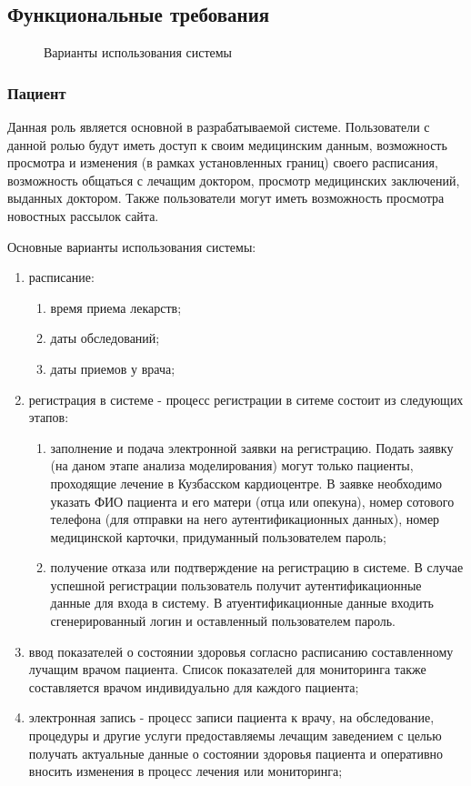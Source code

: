 \subsection{Функциональные требования}
\begin{figure}[h]
\caption{Варианты использования системы}
\label{ris:main_use_case}
\end{figure}

\subsubsection{Пациент}
Данная роль является основной в разрабатываемой системе. Пользователи с данной
ролью будут иметь доступ к своим медицинским данным, возможность просмотра и
изменения (в рамках установленных границ) своего расписания, возможность
общаться с лечащим доктором, просмотр медицинских заключений, выданных доктором.
Также пользователи могут иметь возможность просмотра новостных рассылок сайта.

Основные варианты использования системы:

\begin{enumerate}
  \item расписание:
  \begin{enumerate}
    \item время приема лекарств;
    \item даты обследований;
    \item даты приемов у врача;     
  \end{enumerate}
  \item регистрация в системе - процесс регистрации в ситеме состоит из
  следующих этапов:
  \begin{enumerate}
    \item заполнение и подача электронной заявки на регистрацию. Подать заявку
    (на даном этапе анализа моделирования) могут только пациенты, проходящие
    лечение в Кузбасском кардиоцентре. 
    В заявке необходимо указать ФИО пациента и его матери (отца или опекуна), номер сотового телефона (для отправки на него аутентификационных данных), номер медицинской карточки, придуманный пользователем пароль;
    \item получение отказа или подтверждение на регистрацию в системе. В случае
    успешной регистрации пользователь получит аутентификационные данные для
    входа в систему. В атуентификационные данные входить сгенерированный логин и
    оставленный пользователем пароль.
  \end{enumerate}
  \item ввод показателей о состоянии здоровья согласно расписанию составленному
лучащим врачом пациента. Список показателей для мониторинга также составляется
врачом индивидуально для каждого пациента;
  \item электронная запись - процесс записи пациента к врачу, на обследование,
процедуры и другие услуги предоставляемы лечащим заведением с целью получать
актуальные данные о состоянии здоровья пациента и оперативно вносить изменения в процесс лечения или мониторинга;
\end{enumerate}

